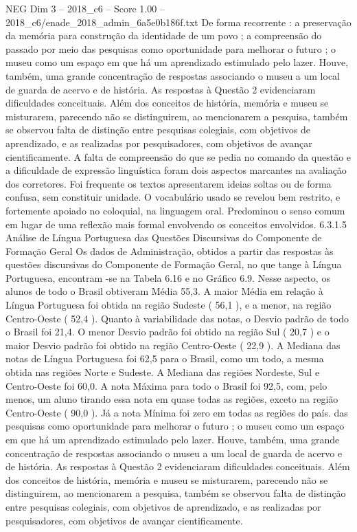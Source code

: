 \begin{textsample}{NEG Dim 3 – 2018\_c6 – Score 1.00 – 2018\_c6/enade\_2018\_admin\_6a5e0b186f.txt}
De forma recorrente : a preservação da memória para construção da identidade de um povo ; a compreensão do passado por meio das pesquisas como oportunidade para melhorar o futuro ; o museu como um espaço em que há um aprendizado estimulado pelo lazer.
Houve, também, uma grande concentração de respostas associando o museu a um local de guarda de acervo e de história.
As respostas à Questão 2 evidenciaram dificuldades conceituais.
Além dos conceitos de história, memória e museu se misturarem, parecendo não se distinguirem, ao mencionarem a pesquisa, também se observou falta de distinção entre pesquisas colegiais, com objetivos de aprendizado, e as realizadas por pesquisadores, com objetivos de avançar cientificamente.
A falta de compreensão do que se pedia no comando da questão e a dificuldade de expressão linguística foram dois aspectos marcantes na avaliação dos corretores.
Foi frequente os textos apresentarem ideias soltas ou de forma confusa, sem constituir unidade.
O vocabulário usado se revelou bem restrito, e fortemente apoiado no coloquial, na linguagem oral.
Predominou o senso comum em lugar de uma reflexão mais formal envolvendo os conceitos envolvidos. 6.3.1.5 Análise de Língua Portuguesa das Questões Discursivas do Componente de Formação Geral Os dados de Administração, obtidos a partir das respostas às questões discursivas do Componente de Formação Geral, no que tange à Língua Portuguesa, encontram -se na Tabela 6.16 e no Gráfico 6.9.
Nesse aspecto, os alunos de todo o Brasil obtiveram Média 55,3.
A maior Média em relação à Língua Portuguesa foi obtida na região Sudeste ( 56,1 ), e a menor, na região Centro-Oeste ( 52,4 ).
Quanto à variabilidade das notas, o Desvio padrão de todo o Brasil foi 21,4.
O menor Desvio padrão foi obtido na região Sul ( 20,7 ) e o maior Desvio padrão foi obtido na região Centro-Oeste ( 22,9 ).
A Mediana das notas de Língua Portuguesa foi 62,5 para o Brasil, como um todo, a mesma obtida nas regiões Norte e Sudeste.
A Mediana das regiões Nordeste, Sul e Centro-Oeste foi 60,0.
A nota Máxima para todo o Brasil foi 92,5, com, pelo menos, um aluno tirando essa nota em quase todas as regiões, exceto na região Centro-Oeste ( 90,0 ).
Já a nota Mínima foi zero em todas as regiões do país. das pesquisas como oportunidade para melhorar o futuro ; o museu como um espaço em que há um aprendizado estimulado pelo lazer.
Houve, também, uma grande concentração de respostas associando o museu a um local de guarda de acervo e de história.
As respostas à Questão 2 evidenciaram dificuldades conceituais.
Além dos conceitos de história, memória e museu se misturarem, parecendo não se distinguirem, ao mencionarem a pesquisa, também se observou falta de distinção entre pesquisas colegiais, com objetivos de aprendizado, e as realizadas por pesquisadores, com objetivos de avançar cientificamente.

\end{textsample}
